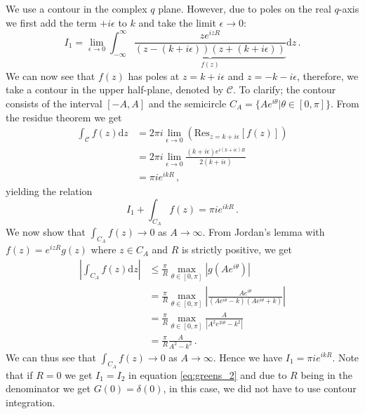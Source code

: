 We use a contour in the complex $q$ plane. However, due to poles on the real $q$-axis we first add the term $+i\epsilon$ to $k$ and take the limit $\epsilon \to 0$:
\begin{equation}
    I_1 = \lim_{\epsilon \to 0} \int_{-\infty}^\infty \underbrace{\frac{z e^{i zR}}{(z-(k+i\epsilon))(z+(k+i\epsilon))}}_{f(z)} \mathrm d z \,. \label{eq:contour_I_1}
\end{equation}
We can now see that $f(z)$ has poles at $z=k+i\epsilon$ and $z=-k-i\epsilon$, therefore, we take a contour in the upper half-plane, denoted by $\mathcal C$.
To clarify; the contour consists of the interval $[-A,A]$ and the semicircle $C_A = \{ Ae^{i\theta} | \theta \in [0, \pi] \}$.
From the residue theorem we get
\begin{align}
    \int_{\mathcal C} f(z) \mathrm d z &= 2 \pi i \lim_{\epsilon \to 0} \left( \textrm{Res}_{z=k+i\epsilon} [f(z)]\right) \nonumber \\
                                       &= 2 \pi i \lim_{\epsilon \to 0} \frac{(k+i\epsilon)e^{i(k+i\epsilon)R}}{2(k+i\epsilon)} \nonumber \\
                                       &= \pi i e^{ikR} \,, \nonumber
\end{align}
yielding the relation
\begin{equation}
    I_1 + \int_{C_A} f(z) = \pi i e^{ikR} \,. \nonumber
\end{equation}
We now show that $\int_{C_A} f(z) \to 0$ as $A \to \infty$.
From Jordan's lemma \cite[Section 74]{complex_jordan} with $f(z) = e^{izR}g(z)$ where $z \in C_A$ and $R$ is strictly positive, we get
\begin{align}
    \left| \int_{C_A} f(z) \mathrm d z \right| &\leq \frac{\pi}{R} \max_{\theta \in [0, \pi]} |g(Ae^{i\theta})| \nonumber \\
                                               &= \frac{\pi}{R} \max_{\theta \in [0, \pi]} \left\lvert \frac{Ae^{i\theta}}{(Ae^{i\theta}-k)(Ae^{i\theta}+k)} \right\rvert \nonumber \\
                                               &= \frac{\pi}{R} \max_{\theta \in [0, \pi]}  \frac{A}{\left\lvert A^2e^{2i\theta}-k^2\right\rvert}  \nonumber \\
                                               &= \frac{\pi}{R} \frac{A}{A^2-k^2} \,. \nonumber
\end{align}
We can thus see that $\int_{C_A} f(z) \to 0$ as $A \to \infty$.
Hence we have $I_1 = \pi i e^{i k R}$.
Note that if $R=0$ we get $I_1=I_2$ in equation \ref{eq:greens_2} and due to $R$ being in the denominator we get $G(0) = \delta(0)$, in this case, we did not have to use contour integration.

